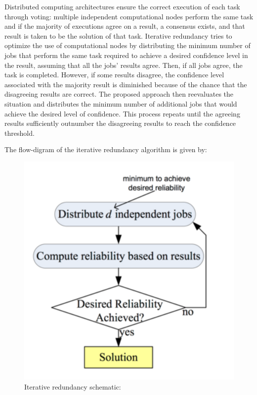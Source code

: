 \begin{compactitem}
Distributed computing architectures ensure the correct execution of each task through voting: multiple independent computational nodes perform the same task and if the majority of executions agree on a result, a consensus exists, and that result is taken to be the solution of that task. Iterative redundancy tries to optimize the use of computational nodes by distributing the minimum number of jobs that perform the same task required to achieve a desired confidence level in the result, assuming that all the jobs’ results agree. Then, if all jobs agree, the task is completed. However, if some results disagree, the confidence level associated with the majority result is diminished because of the chance that the disagreeing results are correct. The proposed approach then reevaluates the situation and distributes the minimum number of additional jobs that would achieve the desired level of confidence.
This process repeats until the agreeing results sufficiently outnumber the disagreeing results to reach the confidence threshold.


The flow-digram of the iterative redundancy algorithm is given by:
\begin{figure}[H]
\center
\includegraphics[width=5in]{img/Iterativeredundancyschematic}
\caption{Iterative redundancy schematic:}
\end{figure} 


\end{compactitem}
